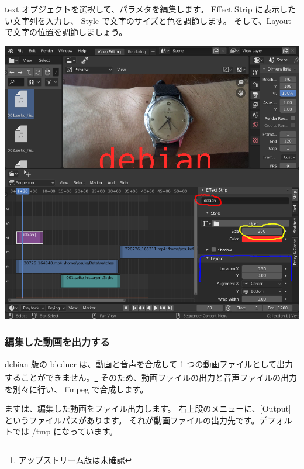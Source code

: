 \documentclass[mingoth,a4paper]{jsarticle}
\begin{document}
text オブジェクトを選択して、パラメタを編集します。
Effect Strip に表示したい文字列を入力し、
Style で文字のサイズと色を調節します。
そして、Layout で文字の位置を調節しましょう。

\begin{center}
\includegraphics[scale=0.3]{image202209/blender_text_params.png }
\end{center}

\subsubsection{編集した動画を出力する}

debian 版の bledner は、動画と音声を合成して 1 つの動画ファイルとして出力することができません。\footnote{アップストリーム版は未確認}
そのため、動画ファイルの出力と音声ファイルの出力を別々に行い、
ffmpeg で合成します。

ますは、編集した動画をファイル出力します。
右上段のメニューに、[Output] というファイルパスがあります。
それが動画ファイルの出力先です。デフォルトでは /tmp になっています。
\end{document}
